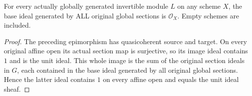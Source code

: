 \begin{proposition}
\label{prop:generated-line-whole-base-ideal-unit}
\leanok
{}
For every actually globally generated invertible module $L$
on any scheme $X$, the base ideal generated by ALL original
global sections is $\mathcal O_X$. Empty schemes are included.
\end{proposition}
\begin{proof}
The preceding epimorphism has quasicoherent source and target.
On every original affine open its actual section map is
surjective, so its image ideal contains $1$ and is the unit
ideal. This whole image is the sum of the original section
ideals in $G$, each contained in the base ideal generated by
all original global sections. Hence the latter ideal contains
$1$ on every affine open and equals the unit ideal sheaf.
\end{proof}
